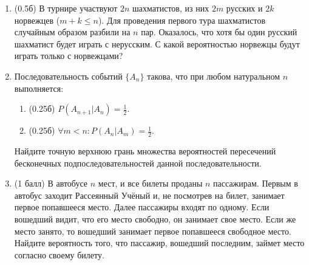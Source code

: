 \documentclass[a4paper, 14pt]{extarticle}
\begin{document}
\begin{enumerate}
\item (0.5б)
В турнире участвуют $2n$ шахматистов, из них $2m$ русских и $2k$ норвежцев ($m+k\leq n$). Для проведения первого тура шахматистов случайным образом разбили на $n$ пар. Оказалось, что хотя бы один русский шахматист будет играть с нерусским. С какой вероятностью норвежцы будут играть только с норвежцами?

\item
Последовательность событий $\{A_n\}$ такова, что при любом натуральном $n$ выполняется:
\begin{enumerate}
  \item (0.25б) $P(A_{n+1}|A_n)=\frac{1}{2}$.
  \item (0.25б) $\forall m<n: P(A_n|A_m)=\frac{1}{2}$.
\end{enumerate}
Найдите точную верхнюю грань множества вероятностей пересечений бесконечных подпоследовательностей данной последовательности.

\item (1 балл)
В автобусе $n$ мест, и все билеты проданы $n$ пассажирам. Первым в автобус заходит Рассеянный Учёный и, не посмотрев на билет, занимает первое попавшееся место. Далее пассажиры входят по одному. Если вошедший видит, что его место свободно, он занимает свое место. Если же место занято, то вошедший занимает первое попавшееся свободное место. Найдите вероятность того, что пассажир, вошедший последним, займет место согласно своему билету.

\end{enumerate}
\newpage
\end{document}
